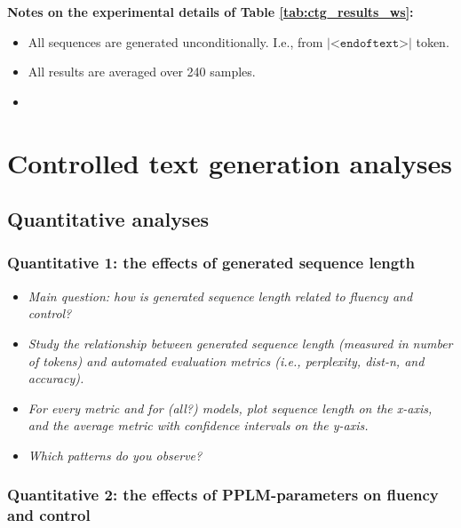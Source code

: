 \textbf{Notes on the experimental details of Table \ref{tab:ctg_results_ws}:}

\begin{itemize}
    \item All sequences are generated unconditionally. I.e., from $\texttt{|<endoftext>|}$ token.
    \item All results are averaged over 240 samples.
    \item 
\end{itemize}


\section{Controlled text generation analyses}

\subsection{Quantitative analyses}


\subsubsection{Quantitative 1: the effects of generated sequence length}

\begin{itemize}
    \item \textit{Main question: how is generated sequence length related to fluency and control?}
    
    \item \textit{Study the relationship between generated sequence length (measured in number of tokens) and automated evaluation metrics (i.e., perplexity, dist-n, and accuracy).}
    
    \item \textit{For every metric and for (all?) models, plot sequence length on the x-axis, and the average metric with confidence intervals on the y-axis.}
    
    \item \textit{Which patterns do you observe?} 
\end{itemize}

\subsubsection{Quantitative 2: the effects of PPLM-parameters on fluency and control}

